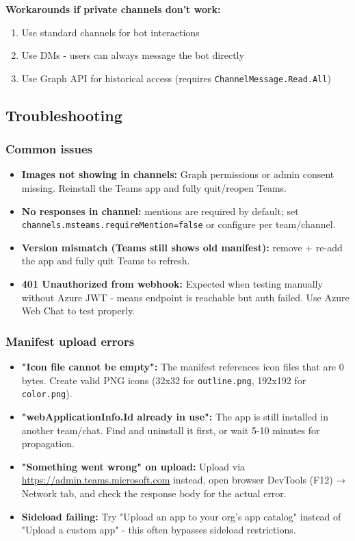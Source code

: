 \textbf{Workarounds if private channels don't work:}

\begin{enumerate}
  \item Use standard channels for bot interactions
  \item Use DMs - users can always message the bot directly
  \item Use Graph API for historical access (requires \texttt{ChannelMessage.Read.All})
\end{enumerate}


\subsection{Troubleshooting}


\subsubsection{Common issues}


\begin{itemize}
  \item \textbf{Images not showing in channels:} Graph permissions or admin consent missing. Reinstall the Teams app and fully quit/reopen Teams.
  \item \textbf{No responses in channel:} mentions are required by default; set \texttt{channels.msteams.requireMention=false} or configure per team/channel.
  \item \textbf{Version mismatch (Teams still shows old manifest):} remove + re-add the app and fully quit Teams to refresh.
  \item \textbf{401 Unauthorized from webhook:} Expected when testing manually without Azure JWT - means endpoint is reachable but auth failed. Use Azure Web Chat to test properly.
\end{itemize}


\subsubsection{Manifest upload errors}


\begin{itemize}
  \item \textbf{"Icon file cannot be empty":} The manifest references icon files that are 0 bytes. Create valid PNG icons (32x32 for \texttt{outline.png}, 192x192 for \texttt{color.png}).
  \item \textbf{"webApplicationInfo.Id already in use":} The app is still installed in another team/chat. Find and uninstall it first, or wait 5-10 minutes for propagation.
  \item \textbf{"Something went wrong" on upload:} Upload via \href{https://admin.teams.microsoft.com}{https://admin.teams.microsoft.com} instead, open browser DevTools (F12) → Network tab, and check the response body for the actual error.
  \item \textbf{Sideload failing:} Try "Upload an app to your org's app catalog" instead of "Upload a custom app" - this often bypasses sideload restrictions.
\end{itemize}


